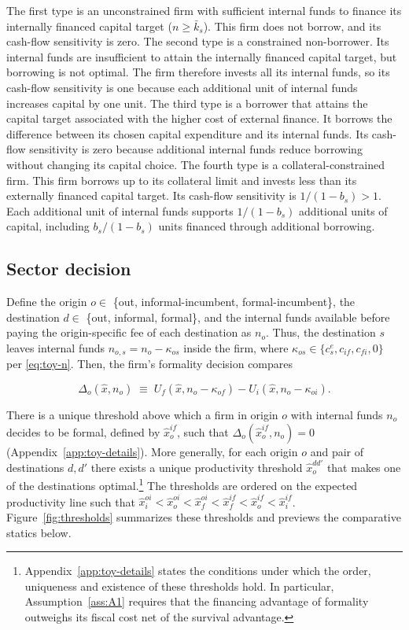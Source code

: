 \documentclass[12pt]{article}
\begin{document}
The first type is an unconstrained firm with sufficient internal funds to finance its internally financed capital target ($n\geq\bar{k}_s$). This firm does not borrow, and its cash-flow sensitivity is zero. The second type is a constrained non-borrower. Its internal funds are insufficient to attain the internally financed capital target, but borrowing is not optimal. The firm therefore invests all its internal funds, so its cash-flow sensitivity is one because each additional unit of internal funds increases capital by one unit. The third type is a borrower that attains the capital target associated with the higher cost of external finance. It borrows the difference between its chosen capital expenditure and its internal funds. Its cash-flow sensitivity is zero because additional internal funds reduce borrowing without changing its capital choice. The fourth type is a collateral-constrained firm. This firm borrows up to its collateral limit and invests less than its externally financed capital target. Its cash-flow sensitivity is $1/(1-b_s) > 1$. Each additional unit of internal funds supports $1/(1-b_s)$ additional units of capital, including $b_s/(1-b_s)$ units financed through additional borrowing. 

\subsection{Sector decision}
\label{sec:toy-sorting}

Define the origin $o \in$ \{out, informal-incumbent, formal-incumbent\}, the destination $d \in$ \{out, informal, formal\}, and the internal funds available before paying the origin-specific fee of each destination as $n_{o}$. Thus, the destination $s$ leaves internal funds $n_{o,s}=n_{o}-\kappa_{os}$ inside the firm, where $\kappa_{os}\in\{c^e_{s},c_{i f},c_{f i},0\}$ per \eqref{eq:toy-n}. Then, the firm's formality decision compares

\begin{equation}
  \Delta_{o}(\hat x,n_{o}) \;\equiv\;
  U_{f}(\hat x,n_{o}-\kappa_{of})
  -U_{i}(\hat x,n_{o}-\kappa_{oi}) .
  \label{eq:toy-Delta}
\end{equation}

There is a unique threshold above which a firm in origin $o$ with internal funds $n_o$ decides to be formal, defined by $\hat x_o^{if}$, such that $\Delta_{o}(\hat x_o^{if},n_{o}) = 0$ (Appendix~\ref{app:toy-details}). More generally, for each origin $o$ and pair of destinations $d, d'$ there exists a unique productivity threshold $\hat x_o^{dd'}$ that makes one of the destinations optimal.\footnote{Appendix~\ref{app:toy-details} states the conditions under which the order, uniqueness and existence of these thresholds hold. In particular, Assumption~\ref{ass:A1} requires that the financing advantage of formality outweighs its fiscal cost net of the survival advantage.} The thresholds are ordered on the expected productivity line such that $ \hat x_i^{oi} < \hat x_o^{oi} < \hat x_f^{oi} < \hat x_f^{if} < \hat x_o^{if} < \hat x_i^{if} $. Figure~\ref{fig:thresholds} summarizes these thresholds and previews the comparative statics below.
\end{document}
